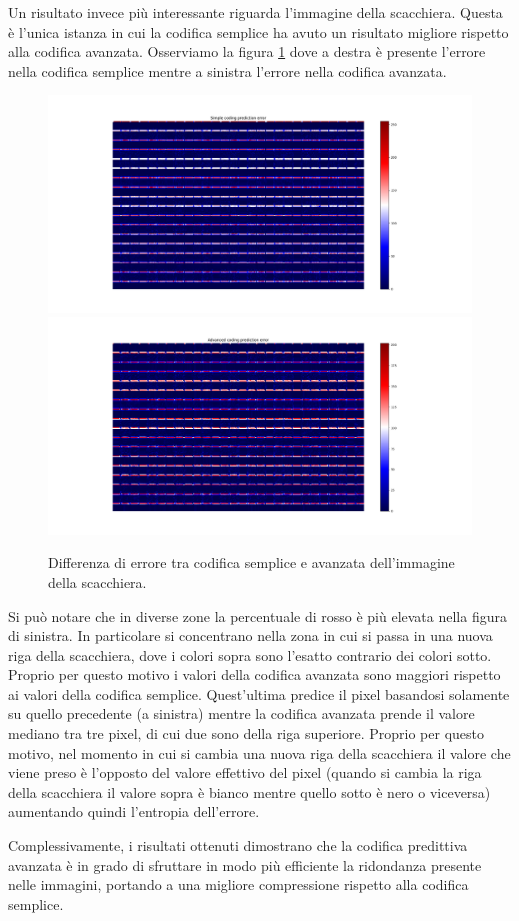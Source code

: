 Un risultato invece più interessante riguarda l'immagine della scacchiera. Questa è l'unica istanza in cui la codifica semplice ha avuto un risultato migliore rispetto alla codifica avanzata. Osserviamo la figura \ref{fig:chessboard} dove a destra è presente l'errore nella codifica semplice mentre a sinistra l'errore nella codifica avanzata. 
\begin{figure}[h]
    \centering
    \includegraphics[width = .49\textwidth]{hw-1/report/imgs/chessboard-simple.png}
    \includegraphics[width = .49\textwidth]{hw-1/report/imgs/chessboard-advanced.png}
    \caption{Differenza di errore tra codifica semplice e avanzata dell'immagine della scacchiera.}
    \label{fig:chessboard}
\end{figure}
Si può notare che in diverse zone la percentuale di rosso è più elevata nella figura di sinistra. In particolare si concentrano nella zona in cui si passa in una nuova riga della scacchiera, dove i colori sopra sono l'esatto contrario dei colori sotto. Proprio per questo motivo i valori della codifica avanzata sono maggiori rispetto ai valori della codifica semplice. Quest'ultima predice il pixel basandosi solamente su quello precedente (a sinistra) mentre la codifica avanzata prende il valore mediano tra tre pixel, di cui due sono della riga superiore. Proprio per questo motivo, nel momento in cui si cambia una nuova riga della scacchiera il valore che viene preso è l'opposto del valore effettivo del pixel (quando si cambia la riga della scacchiera il valore sopra è bianco mentre quello sotto è nero o viceversa) aumentando quindi l'entropia dell'errore.

\vspace{8px}\noindent Complessivamente, i risultati ottenuti dimostrano che la codifica predittiva avanzata è in grado di sfruttare in modo più efficiente la ridondanza presente nelle immagini, portando a una migliore compressione rispetto alla codifica semplice.




